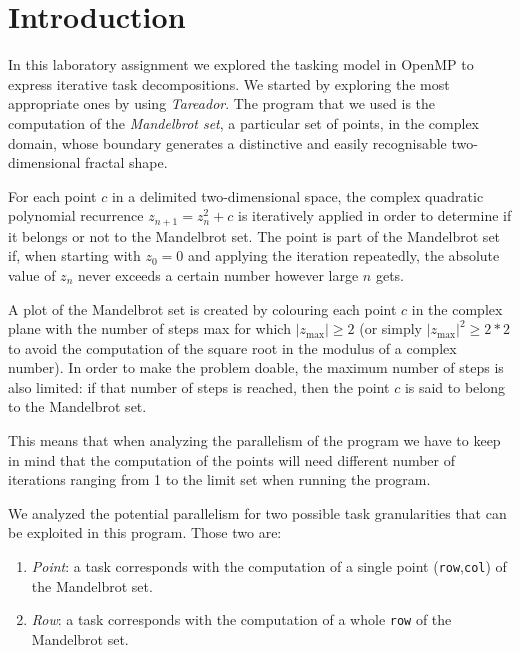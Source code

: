 \tableofcontents
\pagebreak

\null
\vspace{5em}


\section{Introduction}%
\label{sec:Introduction}

In this laboratory assignment we explored the tasking model in OpenMP to express iterative task decompositions. 
We started by exploring the most appropriate ones by using \emph{Tareador}. The program that we used is the computation of the \emph{Mandelbrot set}, a particular set of points, in the complex domain, whose boundary generates a distinctive and easily recognisable two-dimensional fractal shape.

For each point $c$ in a delimited two-dimensional space, the complex quadratic polynomial recurrence $z_{n+1} = z^2_n + c$ is iteratively applied in order to determine if it belongs or not to the Mandelbrot set.  The point is part of the Mandelbrot set if, when starting with $z_0 = 0$ and applying the iteration repeatedly, the absolute value of $z_n$ never exceeds a certain number however large $n$ gets.

A plot of the Mandelbrot set is created by colouring each point $c$ in the complex plane with the number of steps
max for which $|z_{\max}|\geq2$ (or simply $|z_{\max}|^2 \geq 2*2$
to avoid the computation of the square root in the modulus of a complex number).
In order to make the problem doable, the maximum number of steps is also limited:
if that number of steps is reached, then the point $c$ is said to belong to the Mandelbrot set.

This means that when analyzing the parallelism of the program we have to keep in mind that the
computation of the points
will need different number of iterations ranging from 1 to the limit set when running the program.

We analyzed the potential parallelism for two possible task granularities that can be exploited in this program. Those two are:
\begin{enumerate}[label=\alph*)]
\item \emph{Point}: a task corresponds with the computation of a single point (\texttt{row},\texttt{col}) of the Mandelbrot set.
\item \emph{Row}: a task corresponds with the computation of a whole \texttt{row} of the Mandelbrot set.
\end{enumerate}

